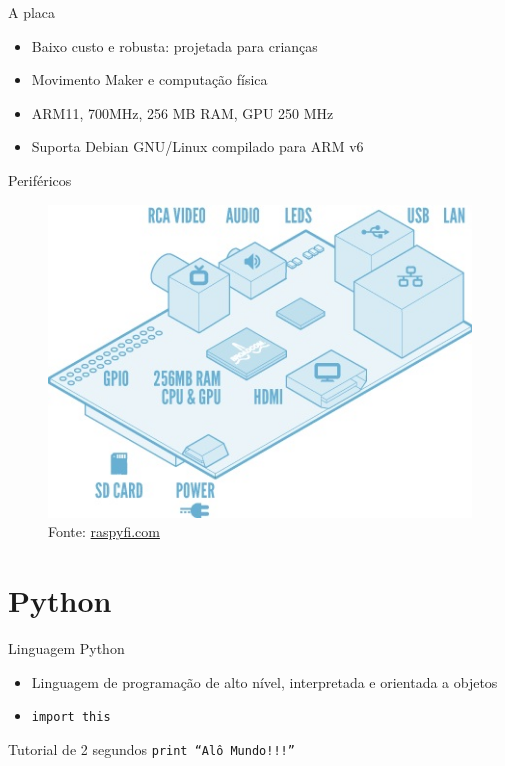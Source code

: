 \documentclass{beamer}
\begin{document}
    \frame{\sectionpage}
    \begin{frame}{A placa}
      \begin{itemize}
	\item Baixo custo e robusta: projetada para crianças
	\item Movimento Maker e computação física
	\item ARM11, 700MHz, 256 MB RAM, GPU 250 MHz
	\item Suporta Debian GNU/Linux compilado para ARM v6
      \end{itemize}
    \end{frame}

    \begin{frame}{Periféricos}
      \begin{figure}[htpb]
	\includegraphics[scale=0.5]{raspberrypi-schematic.jpg}
	\caption{Fonte: \url{raspyfi.com}}
      \end{figure}
    \end{frame}
  \section{Python}
    \frame{\sectionpage}
    
    \begin{frame}{Linguagem Python}
      \begin{itemize}
	\item Linguagem de programação de alto nível, interpretada e orientada a objetos
	\item \texttt{import this}
      \end{itemize}      
    \end{frame}

    \begin{frame}{Tutorial de 2 segundos}
      \texttt{print ``Alô Mundo!!!''}
    \end{frame}
    
\end{document}
